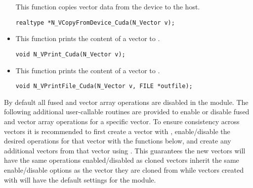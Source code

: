 \begin{itemize}
 This function copies vector data from the device to the host.

 \verb|realtype *N_VCopyFromDevice_Cuda(N_Vector v);|



\item {}

  This function prints the content of a {\cuda} vector to .

  \verb|void N_VPrint_Cuda(N_Vector v);|


\item {}

  This function prints the content of a {\cuda} vector to .

  \verb|void N_VPrintFile_Cuda(N_Vector v, FILE *outfile);|


\end{itemize}
By default all fused and vector array operations are disabled in the {\nveccuda}
module. The following additional user-callable routines are provided to
enable or disable fused and vector array operations for a specific vector. To
ensure consistency across vectors it is recommended to first create a vector
with , enable/disable the desired operations for that vector
with the functions below, and create any additional vectors from that vector
using . This guarantees the new vectors will have the same
operations enabled/disabled as cloned vectors inherit the same enable/disable
options as the vector they are cloned from while vectors created with
 will have the default settings for the {\nveccuda} module.
